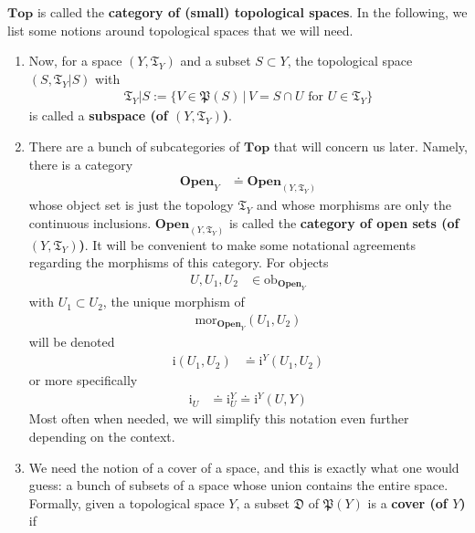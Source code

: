 \begin{exa}
$\mathbf{Top}$ is called the \textbf{category of (small) topological spaces}.
In the following, we list some notions around topological spaces that we will need.
\begin{enumerate}
\item[$\bullet$]
Now, for a space $(Y,\mathfrak{T}_{Y})$ and a subset $S \subset Y$, the topological space $(S,\mathfrak{T}_{Y} \vert S)$ with
\begin{align*}
  \mathfrak{T}_{Y} \vert S
  :=
  \lbrace
      V
      \in
      \mathfrak{P}(S)
    \,
    \vert
    \,
      V
      =
      S
      \cap
      U
      \text{ for }
      U
      \in
      \mathfrak{T}_{Y}
  \rbrace
\end{align*}
is called a \textbf{subspace (of $(Y,\mathfrak{T}_{Y})$)}.
\item[$\bullet$]
There are a bunch of subcategories of $\mathbf{Top}$ that will concern us later.
Namely, there is a category
\begin{align*}
  \mathbf{Open}_{Y}
  &\doteq
  \mathbf{Open}_{(Y,\mathfrak{T}_{Y})}
\end{align*}
whose object set is just the topology $\mathfrak{T}_{Y}$ and whose morphisms are only the continuous inclusions.
$\mathbf{Open}_{(Y,\mathfrak{T}_{Y})}$ is called the \textbf{category of open sets (of $(Y,\mathfrak{T}_{Y})$)}.
It will be convenient to make some notational agreements regarding the morphisms of this category.
For objects
\begin{align*}
  U,
  U_{1},
  U_{2}
  &\in
  \mathrm{ob}_{\mathbf{Open}_{Y}}
\end{align*}
with $U_{1} \subset U_{2}$, the unique morphism of
\begin{align*}
  \mathrm{mor}_{\mathbf{Open}_{Y}}(U_{1},U_{2})
\end{align*}
will be denoted
\begin{align*}
  \mathrm{i}(U_{1},U_{2})
  &\doteq
  \mathrm{i}^{Y}(U_{1},U_{2})
\end{align*}
or more specifically
\begin{align*}
  \mathrm{i}_{U}
  &\doteq
  \mathrm{i}_{U}^{Y}
  \doteq
  \mathrm{i}^{Y}(U,Y)
\end{align*}
Most often when needed, we will simplify this notation even further depending on the context.
\item[$\bullet$]
We need the notion of a cover of a space, and this is exactly what one would guess: a bunch of subsets of a space whose union contains the entire space.
Formally, given a topological space $Y$, a subset $\mathfrak{D}$ of $\mathfrak{P}(Y)$ is a \textbf{cover (of $Y$)} if

\end{enumerate}
\end{exa}
